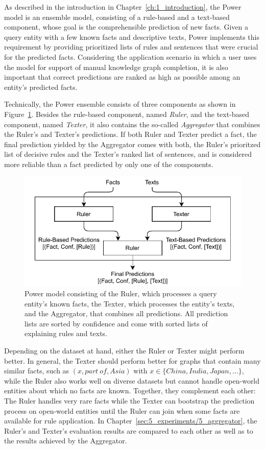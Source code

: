 As described in the introduction in Chapter~\ref{ch:1_introduction}, the Power model is an ensemble model, consisting of a rule-based and a text-based component, whose goal is the comprehensible prediction of new facts. Given a query entity with a few known facts and descriptive texts, Power implements this requirement by providing prioritized lists of rules and sentences that were crucial for the predicted facts. Considering the application scenario in which a user uses the model for support of manual knowledge graph completion, it is also important that correct predictions are ranked as high as possible among an entity's predicted facts.

Technically, the Power ensemble consists of three components as shown in Figure~\ref{fig:4_approach/power_architecture}. Besides the rule-based component, named \emph{Ruler}, and the text-based component, named \emph{Texter}, it also contains the so-called \emph{Aggregator} that combines the Ruler's and Texter's predictions. If both Ruler and Texter predict a fact, the final prediction yielded by the Aggregator comes with both, the Ruler's prioritzed list of decisive rules and the Texter's ranked list of sentences, and is considered more reliable than a fact predicted by only one of the components.

\begin{figure}[t]
    \centering
    \includegraphics[width=\textwidth]{4_approach/power_architecture}
    \caption{Power model consisting of the Ruler, which processes a query entity's known facts, the Texter, which processes the entity's texts, and the Aggregator, that combines all predictions. All prediction lists are sorted by confidence and come with sorted lists of explaining rules and texts.}
    \label{fig:4_approach/power_architecture}
\end{figure}

Depending on the dataset at hand, either the Ruler or Texter might perform better. In general, the Texter should perform better for graphs that contain many similar facts, such as $(x, part~of, Asia)$ with $x \in \{China, India, Japan, \dots\}$, while the Ruler also works well on diverse datasets but cannot handle open-world entities about which no facts are known. Together, they complement each other: The Ruler handles very rare facts while the Texter can bootstrap the prediction process on open-world entities until the Ruler can join when some facts are available for rule application. In Chapter~\ref{sec:5_experiments/5_aggregator}, the Ruler's and Texter's evaluation results are compared to each other as well as to the results achieved by the Aggregator.

